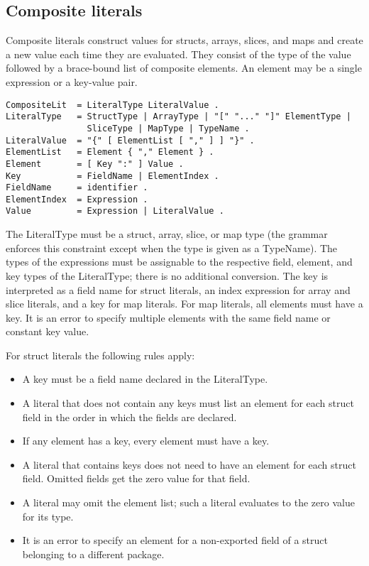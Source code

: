 \subsection*{Composite literals}

Composite literals construct values for structs, arrays, slices, and
maps and create a new value each time they are evaluated. They consist
of the type of the value followed by a brace-bound list of composite
elements. An element may be a single expression or a key-value pair.

\begin{Verbatim}[frame=single]
CompositeLit  = LiteralType LiteralValue .
LiteralType   = StructType | ArrayType | "[" "..." "]" ElementType |
                SliceType | MapType | TypeName .
LiteralValue  = "{" [ ElementList [ "," ] ] "}" .
ElementList   = Element { "," Element } .
Element       = [ Key ":" ] Value .
Key           = FieldName | ElementIndex .
FieldName     = identifier .
ElementIndex  = Expression .
Value         = Expression | LiteralValue .
\end{Verbatim}

The LiteralType must be a struct, array, slice, or map type (the grammar
enforces this constraint except when the type is given as a TypeName).
The types of the expressions must be
assignable to the respective field, element,
and key types of the LiteralType; there is no additional conversion. The
key is interpreted as a field name for struct literals, an index
expression for array and slice literals, and a key for map literals. For
map literals, all elements must have a key. It is an error to specify
multiple elements with the same field name or constant key value.

For struct literals the following rules apply:

\begin{itemize}
\item
  A key must be a field name declared in the LiteralType.
\item
  A literal that does not contain any keys must list an element for each
  struct field in the order in which the fields are declared.
\item
  If any element has a key, every element must have a key.
\item
  A literal that contains keys does not need to have an element for each
  struct field. Omitted fields get the zero value for that field.
\item
  A literal may omit the element list; such a literal evaluates to the
  zero value for its type.
\item
  It is an error to specify an element for a non-exported field of a
  struct belonging to a different package.
\end{itemize}

